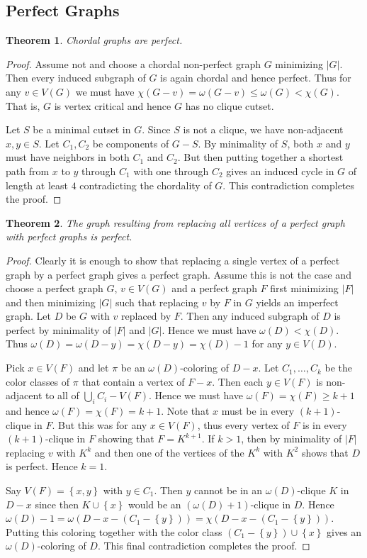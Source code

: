 \documentclass[12pt]{article}
\theoremstyle{plain}
\newtheorem{thm}{Theorem}
\theoremstyle{definition}
\theoremstyle{remark}
\newcommand{\set}[1]{\left\{ #1 \right\}}
\newcommand{\card}[1]{\left|#1\right|}
\begin{document}
\subsection{Perfect Graphs}
\begin{thm}
Chordal graphs are perfect.
\end{thm}
\begin{proof}
Assume not and choose a chordal non-perfect graph $G$ minimizing $\card{G}$.  Then every induced subgraph of $G$ is again chordal and hence perfect.  Thus for any $v \in V(G)$ we must have $\chi(G - v) = \omega(G - v) \leq \omega(G) < \chi(G)$.  That is, $G$ is vertex critical and hence $G$ has no clique cutset.

Let $S$ be a minimal cutset in $G$.  Since $S$ is not a clique, we have non-adjacent $x,y \in S$.  Let $C_1, C_2$ be components of $G-S$.  By minimality of $S$, both $x$ and $y$ must have neighbors in both $C_1$ and $C_2$. But then putting together a shortest path from $x$ to $y$ through $C_1$ with one through $C_2$ gives an induced cycle in $G$ of length at least $4$ contradicting the chordality of $G$.  This contradiction completes the proof.
\end{proof}

\begin{thm}
The graph resulting from replacing all vertices of a perfect graph with perfect graphs is perfect.
\end{thm}
\begin{proof}
Clearly it is enough to show that replacing a single vertex of a perfect graph by a perfect graph gives a perfect graph.  Assume this is not the case and choose a perfect graph $G$, $v \in V(G)$ and a perfect graph $F$ first minimizing $\card{F}$ and then minimizing $\card{G}$ such that replacing $v$ by $F$ in $G$ yields an imperfect graph.  Let $D$ be $G$ with $v$ replaced by $F$.  Then any induced subgraph of $D$ is perfect by minimality of $\card{F}$ and $\card{G}$.  Hence we must have $\omega(D) < \chi(D)$.  Thus $\omega(D) = \omega(D - y) = \chi(D - y) = \chi(D) - 1$ for any $y \in V(D)$.

Pick $x \in V(F)$ and let $\pi$ be an $\omega(D)$-coloring of $D-x$.  Let $C_1, \ldots, C_k$ be the color classes of $\pi$ that contain a vertex of $F-x$.  Then each $y \in V(F)$ is non-adjacent to all of $\bigcup_i C_i - V(F)$.  Hence we must have $\omega(F) = \chi(F) \geq k + 1$ and hence $\omega(F) = \chi(F) = k + 1$. Note that $x$ must be in every $(k+1)$-clique in $F$. But this was for any $x \in V(F)$, thus every vertex of $F$ is in every $(k+1)$-clique in $F$ showing that $F = K^{k+1}$.  If $k > 1$, then by minimality of $\card{F}$ replacing $v$ with $K^k$ and then one of the vertices of the $K^k$ with $K^2$ shows that $D$ is perfect.  Hence $k = 1$.

Say $V(F) = \set{x, y}$ with $y \in C_1$. Then $y$ cannot be in an $\omega(D)$-clique $K$ in $D-x$ since then $K \cup \set{x}$ would be an $(\omega(D) + 1)$-clique in $D$.  Hence $\omega(D) - 1 = \omega(D - x - (C_1 - \set{y})) = \chi(D - x - (C_1 - \set{y}))$.  Putting this coloring together with the color class $(C_1 - \set{y}) \cup \set{x}$ gives an $\omega(D)$-coloring of $D$.  This final contradiction completes the proof.
\end{proof}
\end{document}
